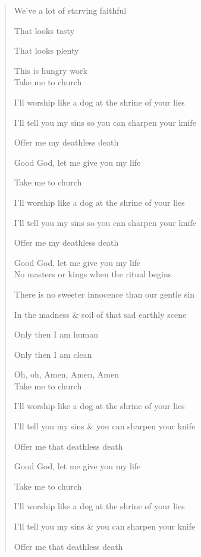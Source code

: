 \documentclass{article}
\begin{document}
\begin{enumerate}
\begin{quotation}
		We've a lot of starving faithful

		That looks tasty

		That looks plenty

		This is hungry work
		\\

		Take me to church

		I'll worship like a dog at the shrine of your lies

		I'll tell you my sins so you can sharpen your knife

		Offer me my deathless death

		Good God, let me give you my life

		Take me to church

		I'll worship like a dog at the shrine of your lies

		I'll tell you my sins so you can sharpen your knife

		Offer me my deathless death

		Good God, let me give you my life
		\\

		No masters or kings when the ritual begins

		There is no sweeter innocence than our gentle sin

		In the madness \& soil of that sad earthly scene

		Only then I am human

		Only then I am clean

		Oh, oh, Amen, Amen, Amen
		\\

		Take me to church

		I'll worship like a dog at the shrine of your lies

		I'll tell you my sins \& you can sharpen your knife

		Offer me that deathless death

		Good God, let me give you my life

		Take me to church

		I'll worship like a dog at the shrine of your lies

		I'll tell you my sins \& you can sharpen your knife

		Offer me that deathless death


\end{quotation}
\end{enumerate}
\end{document}
